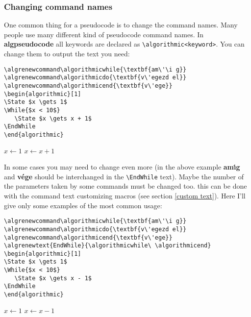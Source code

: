 \documentclass{article}
\begin{document}
\subsubsection{Changing command names}
One common thing for a pseudocode is to change the command names. Many people 
use many different kind of pseudocode command names. In \textbf{algpseudocode} 
all keywords are declared as \verb:\algorithmic<keyword>:. You can change them 
to output the text you need:

\bigskip\noindent\begin{minipage}[b]{0.5\linewidth}
\begin{verbatim}
\algrenewcommand\algorithmicwhile{\textbf{am\'\i g}}
\algrenewcommand\algorithmicdo{\textbf{v\'egezd el}}
\algrenewcommand\algorithmicend{\textbf{v\'ege}}
\begin{algorithmic}[1]
\State $x \gets 1$
\While{$x < 10$}
   \State $x \gets x + 1$
\EndWhile
\end{algorithmic}
\end{verbatim}
\end{minipage}
\begin{minipage}[b]{0.5\linewidth}
\begin{algorithmic}[1]
\algrenewcommand{}
\algrenewcommand{}
\algrenewcommand{}
\State $x \gets 1$
   \State $x \gets x + 1$
\EndWhile
\Statex
\end{algorithmic}
\end{minipage}\bigskip

In some cases you may need to change even more (in the above example 
\textbf{am\'\i g} and \textbf{v\'ege} should be interchanged in the \verb:\EndWhile: 
text). Maybe the number of the parameters taken by some commands must be changed too.
this can be done with the command text customizing macros (see section 
\ref{custom text}). Here I'll give only some examples of the most common usage:

\bigskip\noindent\begin{minipage}[b]{0.5\linewidth}
\begin{verbatim}
\algrenewcommand\algorithmicwhile{\textbf{am\'\i g}}
\algrenewcommand\algorithmicdo{\textbf{v\'egezd el}}
\algrenewcommand\algorithmicend{\textbf{v\'ege}}
\algrenewtext{EndWhile}{\algorithmicwhile\ \algorithmicend}
\begin{algorithmic}[1]
\State $x \gets 1$
\While{$x < 10$}
   \State $x \gets x - 1$
\EndWhile
\end{algorithmic}
\end{verbatim}
\end{minipage}
\begin{minipage}[b]{0.5\linewidth}
\begin{algorithmic}[1]
\algrenewcommand{}
\algrenewcommand{}
\algrenewcommand{}
\State $x \gets 1$
   \State $x \gets x - 1$
\EndWhile
\Statex
\end{algorithmic}
\end{minipage}
\end{document}
